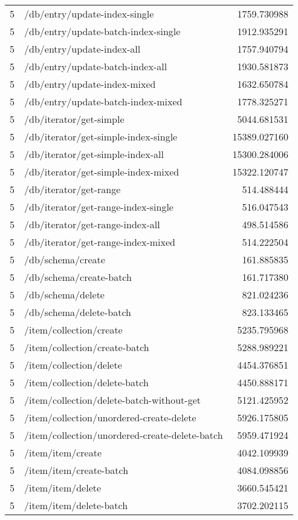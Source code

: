 \begin{longtable}{rlr}
5 & /db/entry/update-index-single & 1759.730988 \\
5 & /db/entry/update-batch-index-single & 1912.935291 \\
5 & /db/entry/update-index-all & 1757.940794 \\
5 & /db/entry/update-batch-index-all & 1930.581873 \\
5 & /db/entry/update-index-mixed & 1632.650784 \\
5 & /db/entry/update-batch-index-mixed & 1778.325271 \\
5 & /db/iterator/get-simple & 5044.681531 \\
5 & /db/iterator/get-simple-index-single & 15389.027160 \\
5 & /db/iterator/get-simple-index-all & 15300.284006 \\
5 & /db/iterator/get-simple-index-mixed & 15322.120747 \\
5 & /db/iterator/get-range & 514.488444 \\
5 & /db/iterator/get-range-index-single & 516.047543 \\
5 & /db/iterator/get-range-index-all & 498.514586 \\
5 & /db/iterator/get-range-index-mixed & 514.222504 \\
5 & /db/schema/create & 161.885835 \\
5 & /db/schema/create-batch & 161.717380 \\
5 & /db/schema/delete & 821.024236 \\
5 & /db/schema/delete-batch & 823.133465 \\
5 & /item/collection/create & 5235.795968 \\
5 & /item/collection/create-batch & 5288.989221 \\
5 & /item/collection/delete & 4454.376851 \\
5 & /item/collection/delete-batch & 4450.888171 \\
5 & /item/collection/delete-batch-without-get & 5121.425952 \\
5 & /item/collection/unordered-create-delete & 5926.175805 \\
5 & /item/collection/unordered-create-delete-batch & 5959.471924 \\
5 & /item/item/create & 4042.109939 \\
5 & /item/item/create-batch & 4084.098856 \\
5 & /item/item/delete & 3660.545421 \\
5 & /item/item/delete-batch & 3702.202115 \\

\end{longtable}
